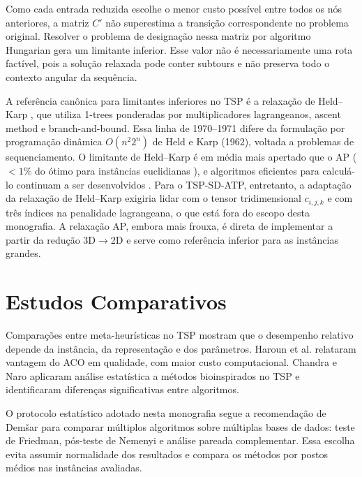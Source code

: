 Como cada entrada reduzida escolhe o menor custo possível entre todos os nós anteriores, a matriz $C'$ não superestima a transição correspondente no problema original. Resolver o problema de designação nessa matriz por algoritmo Hungarian gera um limitante inferior. Esse valor não é necessariamente uma rota factível, pois a solução relaxada pode conter subtours e não preserva todo o contexto angular da sequência.

A referência canônica para limitantes inferiores no \ac{TSP} é a relaxação de Held--Karp \cite{heldkarp1970traveling,heldkarp1971traveling}, que utiliza 1-trees ponderadas por multiplicadores lagrangeanos, ascent method e branch-and-bound. Essa linha de 1970--1971 difere da formulação por programação dinâmica $O(n^2 2^n)$ de Held e Karp (1962), voltada a problemas de sequenciamento. O limitante de Held--Karp é em média mais apertado que o \ac{AP} ($<1\%$ do ótimo para instâncias euclidianas \cite{johnson1996asymptotic}), e algoritmos eficientes para calculá-lo continuam a ser desenvolvidos \cite{righini2021efficient}. Para o \ac{TSP-SD-ATP}, entretanto, a adaptação da relaxação de Held--Karp exigiria lidar com o tensor tridimensional $c_{i,j,k}$ e com três índices na penalidade lagrangeana, o que está fora do escopo desta monografia. A relaxação \ac{AP}, embora mais frouxa, é direta de implementar a partir da redução 3D$\rightarrow$2D e serve como referência inferior para as instâncias grandes.

\section{Estudos Comparativos}
\label{sec:comparativos}

Comparações entre meta-heurísticas no \ac{TSP} mostram que o desempenho relativo depende da instância, da representação e dos parâmetros. Haroun et al. \cite{haroun2015performance} relataram vantagem do \ac{ACO} em qualidade, com maior custo computacional. Chandra e Naro \cite{chandra2022comparative} aplicaram análise estatística a métodos bioinspirados no \ac{TSP} e identificaram diferenças significativas entre algoritmos.

O protocolo estatístico adotado nesta monografia segue a recomendação de Demšar \cite{demsar2006statistical} para comparar múltiplos algoritmos sobre múltiplas bases de dados: teste de Friedman, pós-teste de Nemenyi e análise pareada complementar. Essa escolha evita assumir normalidade dos resultados e compara os métodos por postos médios nas instâncias avaliadas.
